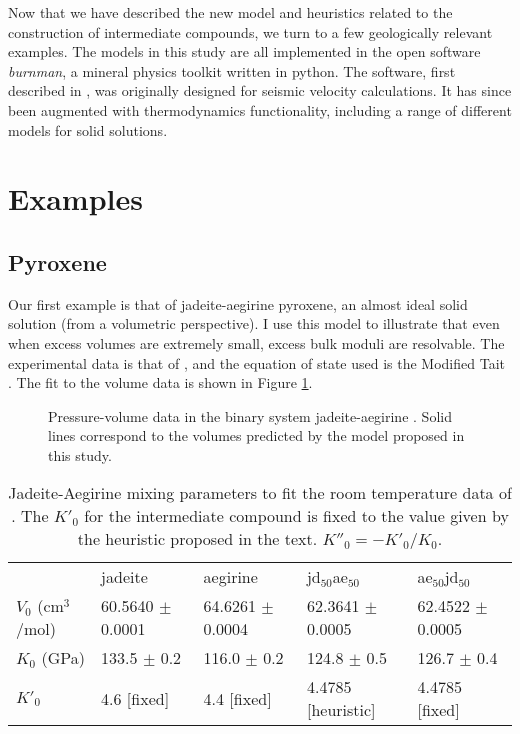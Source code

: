 Now that we have described the new model and heuristics related to the construction of intermediate compounds, we turn to a few geologically relevant examples. The models in this study are all implemented in the open software \emph{burnman}, a mineral physics toolkit written in python. The software, first described in \cite{CHRU2014}, was originally designed for seismic velocity calculations. It has since been augmented with thermodynamics functionality, including a range of different models for solid solutions.

\section{Examples}
\subsection{Pyroxene}
Our first example is that of jadeite-aegirine pyroxene, an almost ideal solid solution (from a volumetric perspective). I use this model to illustrate that even when excess volumes are extremely small, excess bulk moduli are resolvable. The experimental data is that of \cite{NBLBT2006}, and the equation of state used is the Modified Tait \citep{HP2011}. The fit to the volume data is shown in Figure \ref{fig:PV_jadeite_aegirine}.

\begin{figure}[ht!]
  \centering
  \caption{Pressure-volume data in the binary system jadeite-aegirine \citep{NBLBT2006}. Solid lines correspond to the volumes predicted by the model proposed in this study.}
  \label{fig:PV_jadeite_aegirine}
\end{figure}

\begin{table}[ht!]
\centering
\caption{Jadeite-Aegirine mixing parameters to fit the room temperature data of \cite{NBLBT2006}. The $K'_0$ for the intermediate compound is fixed to the value given by the heuristic proposed in the text. $K''_0 = -K'_0/K_0$.}
\label{tab:jd_aeg}
\begin{tabular}{lllll}
                   & jadeite              & aegirine             & jd$_{50}$ae$_{50}$             & ae$_{50}$jd$_{50}$             \\
$V_0$ (cm$^3$/mol) & 60.5640 $\pm$ 0.0001 & 64.6261 $\pm$ 0.0004 & 62.3641 $\pm$ 0.0005 & 62.4522 $\pm$ 0.0005 \\
$K_0$ (GPa)        & 133.5 $\pm$ 0.2      & 116.0 $\pm$ 0.2      & 124.8 $\pm$ 0.5      & 126.7 $\pm$ 0.4      \\
$K'_0$             & 4.6 [fixed]                 & 4.4 [fixed]                 & 4.4785 [heuristic]              & 4.4785  [fixed]           
\end{tabular}
\end{table}

